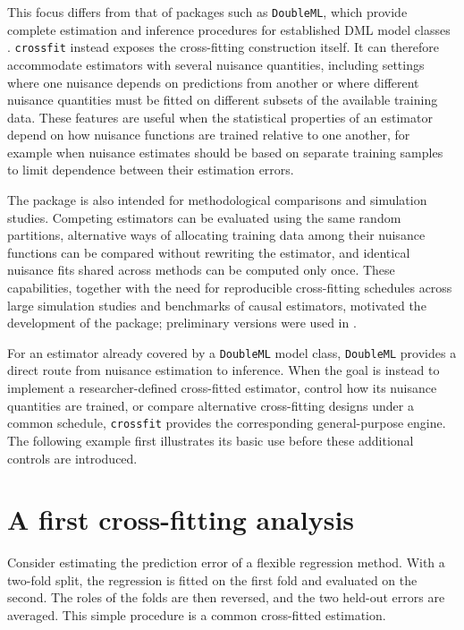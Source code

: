 This focus differs from that of packages such as \texttt{DoubleML}, which provide complete estimation and inference procedures for established DML model classes \citep{bach2024}. \texttt{crossfit} instead exposes the cross-fitting construction itself. It can therefore accommodate estimators with several nuisance quantities, including settings where one nuisance depends on predictions from another or where different nuisance quantities must be fitted on different subsets of the available training data. These features are useful when the statistical properties of an estimator depend on how nuisance functions are trained relative to one another, for example when nuisance estimates should be based on separate training samples to limit dependence between their estimation errors.

The package is also intended for methodological comparisons and simulation studies. Competing estimators can be evaluated using the same random partitions, alternative ways of allocating training data among their nuisance functions can be compared without rewriting the estimator, and identical nuisance fits shared across methods can be computed only once. These capabilities, together with the need for reproducible cross-fitting schedules across large simulation studies and benchmarks of causal estimators, motivated the development of the package; preliminary versions were used in \citep{bouvier2024}.

For an estimator already covered by a \texttt{DoubleML} model class, \texttt{DoubleML} provides a direct route from nuisance estimation to inference. When the goal is instead to implement a researcher-defined cross-fitted estimator, control how its nuisance quantities are trained, or compare alternative cross-fitting designs under a common schedule, \texttt{crossfit} provides the corresponding general-purpose engine. The following example first illustrates its basic use before these additional controls are introduced.

\section{A first cross-fitting analysis}\label{sec:first-analysis}

Consider estimating the prediction error of a flexible regression method. With a two-fold split, the regression is fitted on the first fold and evaluated on the second. The roles of the folds are then reversed, and the two held-out errors are averaged. This simple procedure is a common cross-fitted estimation.

